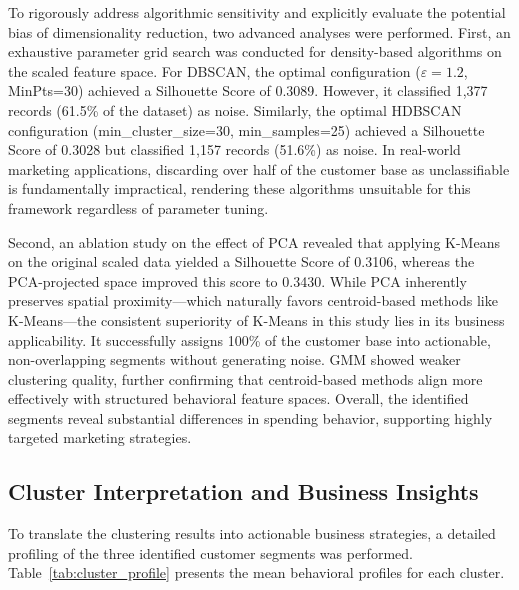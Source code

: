 \documentclass[twoside]{article}
\begin{document}
To rigorously address algorithmic sensitivity and explicitly evaluate the potential bias of dimensionality reduction, two advanced analyses were performed. First, an exhaustive parameter grid search was conducted for density-based algorithms on the scaled feature space. For DBSCAN, the optimal configuration ($\varepsilon=1.2$, MinPts=30) achieved a Silhouette Score of 0.3089. However, it classified 1,377 records (61.5\% of the dataset) as noise. Similarly, the optimal HDBSCAN configuration (min\_cluster\_size=30, min\_samples=25) achieved a Silhouette Score of 0.3028 but classified 1,157 records (51.6\%) as noise. In real-world marketing applications, discarding over half of the customer base as unclassifiable is fundamentally impractical, rendering these algorithms unsuitable for this framework regardless of parameter tuning.

Second, an ablation study on the effect of PCA revealed that applying K-Means on the original scaled data yielded a Silhouette Score of 0.3106, whereas the PCA-projected space improved this score to 0.3430. While PCA inherently preserves spatial proximity---which naturally favors centroid-based methods like K-Means---the consistent superiority of K-Means in this study lies in its business applicability. It successfully assigns 100\% of the customer base into actionable, non-overlapping segments without generating noise. GMM showed weaker clustering quality, further confirming that centroid-based methods align more effectively with structured behavioral feature spaces. Overall, the identified segments reveal substantial differences in spending behavior, supporting highly targeted marketing strategies.

\subsection{Cluster Interpretation and Business Insights}

To translate the clustering results into actionable business strategies, a detailed profiling of the three identified customer segments was performed. Table~\ref{tab:cluster_profile} presents the mean behavioral profiles for each cluster.
\end{document}
